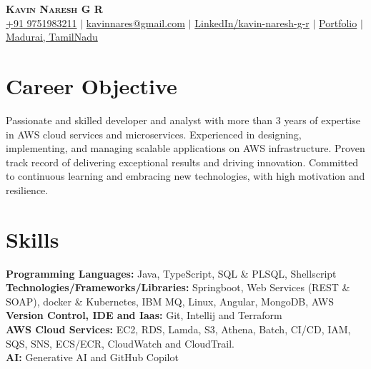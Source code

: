 \documentclass[letterpaper,10pt]{article}
\newcommand{\resumeSubHeadingListStart}{\begin{itemize}[leftmargin=0.15in, label={}]}
\newcommand{\resumeSubHeadingListEnd}{\end{itemize}}
\begin{document}
\begin{center}
    \textbf{\Huge \scshape Kavin Naresh G R} \\ \vspace{1pt}
    \small
    \textcolor{mygreen}{\faMobile \hspace{.5pt} \href{tel:9751983211}{+91 9751983211}}
    $|$
    \textcolor{myred}{\faAt \hspace{.5pt} \href{mailto:kavinnares@gmail.com}{kavinnares@gmail.com}}
    $|$
    \textcolor{RoyalBlue}{\faLinkedinSquare \hspace{.5pt} \href{https://www.linkedin.com/in/kavin-naresh-g-r/}{LinkedIn/kavin-naresh-g-r}}
    $|$
    \textcolor{myblue}{\faGlobe \hspace{.5pt} \href{https://kavinkavin16.github.io/portfolio/}{Portfolio}}
    $|$
    \textcolor{DarkOrchid}{\faMapMarker \hspace{.5pt} \href{https://maps.app.goo.gl/7d4xVmMTN6pnK8Dj8}{Madurai, TamilNadu}}
\end{center}

\section{Career Objective}
  \vspace{6pt}
Passionate and skilled developer and analyst with more than 3 years of expertise in AWS cloud services and microservices. Experienced in designing, implementing, and managing scalable applications on AWS infrastructure. Proven track record of delivering exceptional results and driving innovation. Committed to continuous learning and embracing new technologies, with high motivation and resilience.


\section{Skills}
  \vspace{3pt}
  \resumeSubHeadingListStart
    \small{\item{
        
        \textbf{Programming Languages:}{ Java, TypeScript, SQL \& PLSQL, Shellscript} \\ \vspace{3pt}
        \textbf{Technologies/Frameworks/Libraries:}{ Springboot, Web Services (REST \& SOAP), docker \& Kubernetes, IBM MQ, Linux, Angular, MongoDB, AWS } \\ \vspace{3pt}
        \textbf{Version Control, IDE and Iaas:}{ Git, Intellij and Terraform } \\ \vspace{3pt}
        \textbf{AWS Cloud Services:}{ EC2, RDS, Lamda, S3, Athena, Batch, CI/CD, IAM, SQS, SNS, ECS/ECR, CloudWatch and CloudTrail. } \\ \vspace{3pt}
        \textbf{AI:}{ Generative AI and GitHub Copilot} \\ \vspace{3pt}
    }}
  \resumeSubHeadingListEnd
\end{document}
